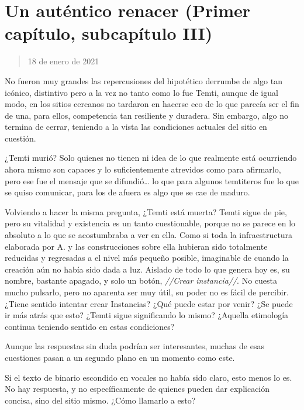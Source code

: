 \documentclass[
  spanish,
]{book}
\begin{document}
\hypertarget{un-autuxe9ntico-renacer-primer-capuxedtulo-subcapuxedtulo-iii}{%
\section{Un auténtico renacer (Primer capítulo, subcapítulo III)}\label{un-autuxe9ntico-renacer-primer-capuxedtulo-subcapuxedtulo-iii}}

\begin{quote}
18 de enero de 2021
\end{quote}

No fueron muy grandes las repercusiones del hipotético derrumbe de algo tan icónico, distintivo pero a la vez no tanto como lo fue Temti, aunque de igual modo, en los sitios cercanos no tardaron en hacerse eco de lo que parecía ser el fin de una, para ellos, competencia tan resiliente y duradera. Sin embargo, algo no termina de cerrar, teniendo a la vista las condiciones actuales del sitio en cuestión.

¿Temti murió?
Solo quienes no tienen ni idea de lo que realmente está ocurriendo ahora mismo son capaces y lo suficientemente atrevidos como para afirmarlo, pero ese fue el mensaje que se difundió\ldots{} lo que para algunos temtiteros fue lo que se quiso comunicar, para los de afuera es algo que se cae de maduro.

Volviendo a hacer la misma pregunta, ¿Temti está muerta?
Temti sigue de pie, pero su vitalidad y existencia es un tanto cuestionable, porque no se parece en lo absoluto a lo que se acostumbraba a ver en ella.
Como si toda la infraestructura elaborada por A. y las construcciones sobre ella hubieran sido totalmente reducidas y regresadas a el nivel más pequeño posible, imaginable de cuando la creación aún no había sido dada a luz.
Aislado de todo lo que genera hoy es, su nombre, bastante apagado, y solo un botón, \emph{//Crear instancia//}. No cuesta mucho pulsarlo, pero no aparenta ser muy útil, su poder no es fácil de percibir. ¿Tiene sentido intentar crear Instancias? ¿Qué puede estar por venir? ¿Se puede ir más atrás que esto? ¿Temti sigue significando lo mismo? ¿Aquella etimología continua teniendo sentido en estas condiciones?

Aunque las respuestas sin duda podrían ser interesantes, muchas de esas cuestiones pasan a un segundo plano en un momento como este.

Si el texto de binario escondido en vocales no había sido claro, esto menos lo es. No hay respuesta, y no específicamente de quienes pueden dar explicación concisa, sino del sitio mismo. ¿Cómo llamarlo a esto?
\end{document}
